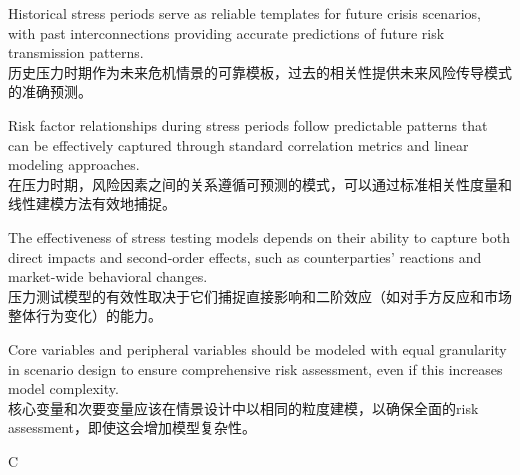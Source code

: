 \documentclass{article}
\begin{document}
\begin{choices}
    \item Historical stress periods serve as reliable templates for future crisis scenarios, with past interconnections providing accurate predictions of future risk transmission patterns.\\
    历史压力时期作为未来危机情景的可靠模板，过去的相关性提供未来风险传导模式的准确预测。
    \item Risk factor relationships during stress periods follow predictable patterns that can be effectively captured through standard correlation metrics and linear modeling approaches.\\
    在压力时期，风险因素之间的关系遵循可预测的模式，可以通过标准相关性度量和线性建模方法有效地捕捉。
    \item The effectiveness of stress testing models depends on their ability to capture both direct impacts and second-order effects, such as counterparties' reactions and market-wide behavioral changes.\\
    压力测试模型的有效性取决于它们捕捉直接影响和二阶效应（如对手方反应和市场整体行为变化）的能力。
    \item Core variables and peripheral variables should be modeled with equal granularity in scenario design to ensure comprehensive risk assessment, even if this increases model complexity.\\
    核心变量和次要变量应该在情景设计中以相同的粒度建模，以确保全面的risk assessment，即使这会增加模型复杂性。
\end{choices}

\begin{correctanswer}
    C
\end{correctanswer}
\end{document}
